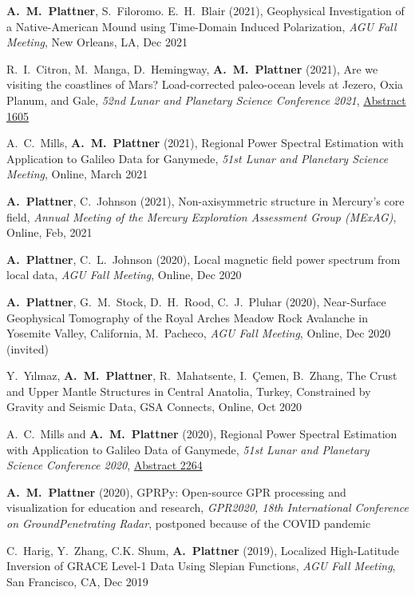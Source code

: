 \documentclass[10pt]{article}
\begin{document}
\spcp \textbf{A.~M.~Plattner}, S.~Filoromo. E.~H.~Blair (2021),
Geophysical Investigation of a Native-American Mound using Time-Domain
Induced Polarization, \emph{AGU Fall Meeting}, New Orleans, LA, Dec
2021

\spcp
R.~I.~Citron, M.~Manga, D.~Hemingway, \textbf{A.~M.~Plattner} (2021),
Are we visiting the coastlines of Mars? Load-corrected paleo-ocean levels at Jezero, Oxia Planum, and Gale,
\emph{52nd Lunar and Planetary Science Conference 2021},
\href{https://www.hou.usra.edu/meetings/lpsc2021/pdf/1605.pdf}{Abstract 1605}

\spcp A.~C.~Mills, \textbf{A.~M.~Plattner} (2021), Regional Power
Spectral Estimation with Application to Galileo Data for Ganymede,
\emph{51st Lunar and Planetary Science Meeting}, Online, March 2021

\spcp \textbf{A.~Plattner}, C.~Johnson (2021), Non-axisymmetric
structure in Mercury's core field, \emph{Annual Meeting of the Mercury
Exploration Assessment Group (MExAG)}, Online, Feb, 2021

\spcp \textbf{A.~Plattner}, C.~L.~Johnson (2020),
Local magnetic field power spectrum from local data,
\emph{AGU Fall Meeting}, Online, Dec 2020 

\spcp \textbf{A.~Plattner}, G.~M.~Stock, D.~H.~Rood, C.~J.~Pluhar
(2020), Near-Surface Geophysical Tomography of the Royal Arches Meadow
Rock Avalanche in Yosemite Valley, California, M.~Pacheco, \emph{AGU
Fall Meeting}, Online, Dec 2020 (invited)

\spcp
Y.~Y\i lmaz, \textbf{A.~M.~Plattner}, R.~Mahatsente, I.~\c Cemen, B.~Zhang,
 The Crust and Upper Mantle Structures in Central Anatolia, Turkey, Constrained by Gravity and Seismic Data, GSA Connects, Online, Oct 2020

\spcp
A.~C.~Mills and \textbf{A.~M.~Plattner} (2020),
Regional Power Spectral Estimation with Application to Galileo Data of Ganymede,
\emph{51st Lunar and Planetary Science Conference 2020},
\href{https://www.hou.usra.edu/meetings/lpsc2020/pdf/2264.pdf}{Abstract 2264}
 
\spcp \textbf{A.~M.~Plattner} (2020), GPRPy: Open-source GPR processing
and visualization for education and research, \emph{GPR2020, 18th
International Conference on GroundPenetrating Radar}, postponed
because of the COVID pandemic

\spcp C.~Harig, Y.~Zhang, C.K. Shum, \textbf{A.~Plattner} (2019),
Localized High-Latitude Inversion of GRACE Level-1 Data Using Slepian Functions,
\emph{AGU Fall Meeting}, San Francisco, CA, Dec 2019
\end{document}

